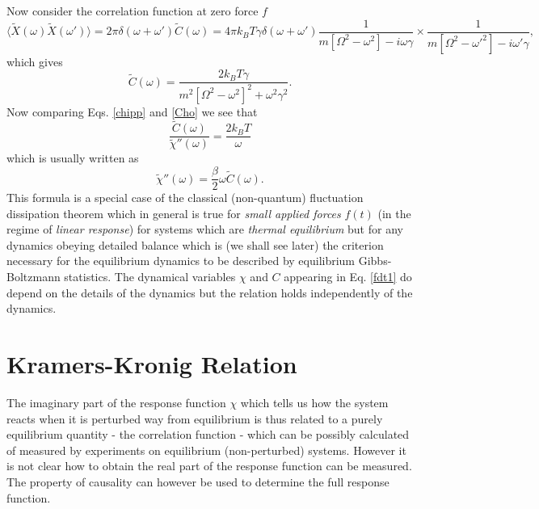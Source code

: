 \documentclass[11pt]{report}
\begin{document}
 
 Now consider the correlation function at zero force $f$
  \begin{equation}
 \langle \tilde X(\omega)\tilde X(\omega')\rangle = 2\pi \delta(\omega+\omega')\tilde C(\omega) = 4\pi k_BT\gamma \delta(\omega+\omega')\frac{1}{m[\Omega^2-\omega^2] - i\omega\gamma}\times\frac{1}{m[\Omega^2-\omega'^2] - i\omega'\gamma},
 \end{equation}
 which gives
 \begin{equation}
 \tilde C(\omega) = \frac{2k_BT\gamma}{m^2[\Omega^2-\omega^2]^2+\omega^2\gamma^2}.
 \label{Cho}
 \end{equation}
 Now comparing Eqs. \eqref{chipp} and \eqref{Cho} we see that
 \begin{equation}
 \frac{\tilde C(\omega)}{\tilde \chi''(\omega)} = \frac{2k_BT}{\omega}
 \end{equation}
 which is usually written as
 \begin{equation}
 \boxed{
 \tilde \chi''(\omega) = \frac{\beta}{2}\omega\tilde C(\omega)}.\label{fdt1}
 \end{equation}
 This formula is a special case of the classical (non-quantum) fluctuation dissipation theorem which in general is true for {\em small applied forces} $f(t)$ (in the regime of {\em linear response}) for systems which are {\em thermal equilibrium} but for 
 any dynamics obeying detailed balance which is (we shall see later) the criterion necessary for the equilibrium dynamics to be described by equilibrium Gibbs-Boltzmann statistics. The dynamical variables $\chi$ and $C$ appearing in Eq. \eqref{fdt1} do depend on the details of
 the dynamics but the relation holds independently of the dynamics. 

\section{Kramers-Kronig Relation}  
The imaginary part of the response function $\chi$ which tells us how the system reacts when it is perturbed way from equilibrium is thus related to a purely equilibrium quantity - the correlation function - which can be possibly calculated of measured by experiments on equilibrium (non-perturbed) systems. However it is not clear how to obtain the real part of the response function can be measured. The property of causality can however be used to determine the full response function.
\end{document}
